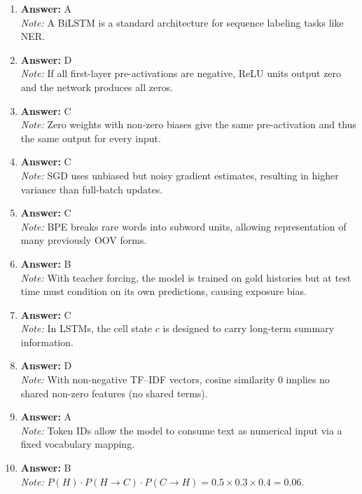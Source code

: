 \documentclass[12pt]{article}
\begin{document}
\begin{enumerate}[label=Q\arabic*.]
 \item \textbf{Answer:} A \\
 \textit{Note:} A BiLSTM is a standard architecture for sequence labeling tasks like NER.
 
 \item \textbf{Answer:} D \\
 \textit{Note:} If all first-layer pre-activations are negative, ReLU units output zero and the network produces all zeros.
 
 \item \textbf{Answer:} C \\
 \textit{Note:} Zero weights with non-zero biases give the same pre-activation and thus the same output for every input.
 
 \item \textbf{Answer:} C \\
 \textit{Note:} SGD uses unbiased but noisy gradient estimates, resulting in higher variance than full-batch updates.
 
 \item \textbf{Answer:} C \\
 \textit{Note:} BPE breaks rare words into subword units, allowing representation of many previously OOV forms.
 
 \item \textbf{Answer:} B \\
 \textit{Note:} With teacher forcing, the model is trained on gold histories but at test time must condition on its own predictions, causing exposure bias.
 
 \item \textbf{Answer:} C \\
 \textit{Note:} In LSTMs, the cell state $c$ is designed to carry long-term summary information.
 
 \item \textbf{Answer:} D \\
 \textit{Note:} With non-negative TF--IDF vectors, cosine similarity $0$ implies no shared non-zero features (no shared terms).
 
 \item \textbf{Answer:} A \\
 \textit{Note:} Token IDs allow the model to consume text as numerical input via a fixed vocabulary mapping.
 
 \item \textbf{Answer:} B \\
 \textit{Note:} $P(H) \cdot P(H \rightarrow C) \cdot P(C \rightarrow H) = 0.5 \times 0.3 \times 0.4 = 0.06$.
 

\end{enumerate}
\end{document}
